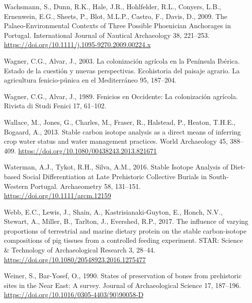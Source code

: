 \documentclass[3p]{elsarticle} %
\newlength{\cslhangindent}
\newlength{\cslentryspacingunit} %
\newenvironment{CSLReferences}[2] %
 {%
  \setlength{\parindent}{0pt}
  \ifodd #1
  \let\oldpar\par
  \def\par{\hangindent=\cslhangindent\oldpar}
  \fi
  \setlength{\parskip}{#2\cslentryspacingunit}
 }%
 {}
\begin{document}
\begin{CSLReferences}{1}{0}
\leavevmode{}%
Wachsmann, S., Dunn, R.K., Hale, J.R., Hohlfelder, R.L., Conyers, L.B., Ernenwein, E.G., Sheets, P., Blot, M.L.P., Castro, F., Davis, D., 2009. The {Palaeo}‐{Environmental Contexts} of {Three Possible Phoenician Anchorages} in {Portugal}. International Journal of Nautical Archaeology 38, 221--253. \url{https://doi.org/10.1111/j.1095-9270.2009.00224.x}

\leavevmode{}%
Wagner, C.G., Alvar, J., 2003. La colonización agrícola en la {Península Ibérica}. {Estado} de la cuestión y nuevas perspectivas. Ecohistoria del paisaje agrario. La agricultura fenicio-púnica en el Mediterráneo 95, 187--204.

\leavevmode{}%
Wagner, C.G., Alvar, J., 1989. Fenicios en {Occidente}: La colonización agrícola. Rivista di Studi Fenici 17, 61--102.

\leavevmode{}%
Wallace, M., Jones, G., Charles, M., Fraser, R., Halstead, P., Heaton, T.H.E., Bogaard, A., 2013. Stable carbon isotope analysis as a direct means of inferring crop water status and water management practices. World Archaeology 45, 388--409. \url{https://doi.org/10.1080/00438243.2013.821671}

\leavevmode{}%
Waterman, A.J., Tykot, R.H., Silva, A.M., 2016. Stable {Isotope Analysis} of {Diet}-based {Social Differentiation} at {Late Prehistoric Collective Burials} in {South}-{Western Portugal}. Archaeometry 58, 131--151. \url{https://doi.org/10.1111/arcm.12159}

\leavevmode{}%
Webb, E.C., Lewis, J., Shain, A., Kastrisianaki-Guyton, E., Honch, N.V., Stewart, A., Miller, B., Tarlton, J., Evershed, R.P., 2017. The influence of varying proportions of terrestrial and marine dietary protein on the stable carbon-isotope compositions of pig tissues from a controlled feeding experiment. STAR: Science \& Technology of Archaeological Research 3, 28--44. \url{https://doi.org/10.1080/20548923.2016.1275477}

\leavevmode{}%
Weiner, S., Bar-Yosef, O., 1990. States of preservation of bones from prehistoric sites in the {Near East}: {A} survey. Journal of Archaeological Science 17, 187--196. \url{https://doi.org/10.1016/0305-4403(90)90058-D}


\end{CSLReferences}
\end{document}
